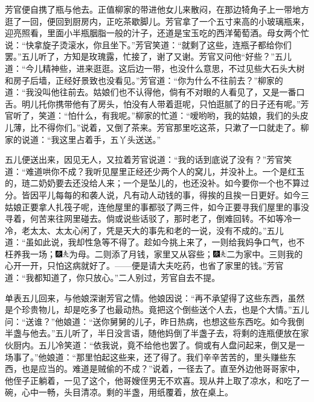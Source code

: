 芳官便自携了瓶与他去。正值柳家的带进他女儿来散闷，在那边犄角子上一带地方逛了一回，便回到厨房内，正吃茶歇脚儿。芳官拿了一个五寸来高的小玻璃瓶来，迎亮照看，里面小半瓶胭脂一般的汁子，还道是宝玉吃的西洋葡萄酒。母女两个忙说：``快拿旋子烫滚水，你且坐下。''芳官笑道：``就剩了这些，连瓶子都给你们罢。''五儿听了，方知是玫瑰露，忙接了，谢了又谢。芳官又问他``好些？''五儿道：``今儿精神些，进来逛逛。这后边一带，也没什么意思，不过见些大石头大树和房子后墙，正经好景致也没看见。''芳官道：``你为什么不往前去？''柳家的道：``我没叫他往前去。姑娘们也不认得他，倘有不对眼的人看见了，又是一番口舌。明儿托你携带他有了房头，怕没有人带着逛呢，只怕逛腻了的日子还有呢。''芳官听了，笑道：``怕什么，有我呢。''柳家的忙道：``嗳哟哟，我的姑娘，我们的头皮儿薄，比不得你们。''说着，又倒了茶来。芳官那里吃这茶，只漱了一口就走了。柳家的说道：``我这里占着手，五丫头送送。''

五儿便送出来，因见无人，又拉着芳官说道：``我的话到底说了没有？''芳官笑道：``难道哄你不成？我听见屋里正经还少两个人的窝儿，并没补上。一个是红玉的，琏二奶奶要去还没给人来；一个是坠儿的，也还没补。如今要你一个也不算过分。皆因平儿每每的和袭人说，凡有动人动钱的事，得挨的且挨一日更好。如今三姑娘正要拿人扎筏子呢，连他屋里的事都驳了两三件，如今正要寻我们屋里的事没寻着，何苦来往网里碰去。倘或说些话驳了，那时老了，倒难回转。不如等冷一冷，老太太、太太心闲了，凭是天大的事先和老的一说，没有不成的。''五儿道：``虽如此说，我却性急等不得了。趁如今挑上来了，一则给我妈争口气，也不枉养我一场；{\includegraphics[width=3mm]{../Images/00004}\includegraphics[width=3mm]{../Images/00012}\footnotesize \kaishu 为母。}二则添了月钱，家里又从容些；{\includegraphics[width=3mm]{../Images/00004}\includegraphics[width=3mm]{../Images/00012}\footnotesize \kaishu 二为家中。}三则我的心开一开，只怕这病就好了。------便是请大夫吃药，也省了家里的钱。''芳官道：``我都知道了，你只放心。''二人别过，芳官自去不提。

单表五儿回来，与他娘深谢芳官之情。他娘因说：``再不承望得了这些东西，虽然是个珍贵物儿，却是吃多了也最动热。竟把这个倒些送个人去，也是个大情。''五儿问：``送谁？''他娘道：``送你舅舅的儿子，昨日热病，也想这些东西吃。如今我倒半盏与他去。''五儿听了，半日没言语，随他妈倒了半盏子去，将剩的连瓶便放在家伙厨内。五儿冷笑道：``依我说，竟不给他也罢了。倘或有人盘问起来，倒又是一场事了。''他娘道：``那里怕起这些来，还了得了。我们辛辛苦苦的，里头赚些东西，也是应当的。难道是贼偷的不成？''说着，一径去了。直至外边他哥哥家中，他侄子正躺着，一见了这个，他哥嫂侄男无不欢喜。现从井上取了凉水，和吃了一碗，心中一畅，头目清凉。剩的半盏，用纸覆着，放在桌上。

